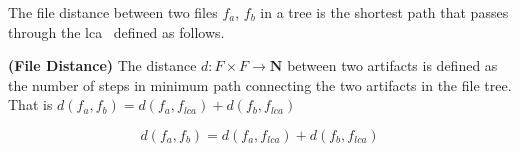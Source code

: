 The file distance between two files $f_a$, $f_b$ in a tree is the shortest path that passes through the \gls{lca}~\cite{Bender2000} defined as follows.
%




\begin{definition} {\bf (File Distance)} 
	The distance $d : F \times F \rightarrow \mathbf{N} $ between two artifacts is defined as the number of steps in minimum path connecting the two artifacts in the file tree.
	That is $d(f_a, f_b) = d(f_a, f_{lca}) + d(f_b, f_{lca})$  
	
	\label{definition:artifact-distance}
	\[
		d(f_a, f_b) = d(f_a, f_{lca}) + d(f_b, f_{lca})
	\]	
\end{definition}

